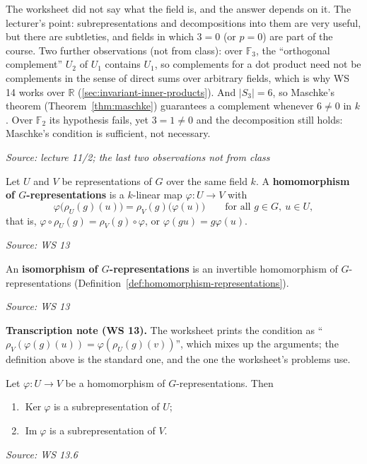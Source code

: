 \documentclass[11pt]{report}
\newcommand{\srcline}[1]{\par\hfill{\footnotesize\textit{Source: #1}}}
\begin{document}
\begin{rembox}\label{rem:why-tricky}
The worksheet did not say what the field is, and the answer depends on it. The lecturer's point: subrepresentations and decompositions into them are very useful, but there are subtleties, and fields in which $3 = 0$ (or $p = 0$) are part of the course. Two further observations (not from class): over $\mathbb{F}_3$, the ``orthogonal complement'' $U_2$ of $U_1$ contains $U_1$, so complements for a dot product need not be complements in the sense of direct sums over arbitrary fields, which is why WS 14 works over $\mathbb{R}$ (\ref{sec:invariant-inner-products}). And $|S_3| = 6$, so Maschke's theorem (Theorem~\ref{thm:maschke}) guarantees a complement whenever $6 \neq 0$ in $k$. Over $\mathbb{F}_2$ its hypothesis fails, yet $3 = 1 \neq 0$ and the decomposition still holds: Maschke's condition is sufficient, not necessary.
\srcline{lecture 11/2; the last two observations not from class}
\end{rembox}

\begin{defbox}\label{def:homomorphism-representations}
Let $U$ and $V$ be representations of $G$ over the same field $k$. A \textbf{homomorphism of $G$-representations} is a $k$-linear map $\varphi: U \to V$ with
\[ \varphi\big(\rho_U(g)(u)\big) = \rho_V(g)\big(\varphi(u)\big) \qquad \text{for all } g \in G,\ u \in U, \]
that is, $\varphi \circ \rho_U(g) = \rho_V(g) \circ \varphi$, or $\varphi(gu) = g\varphi(u)$.
\srcline{WS 13}
\end{defbox}

\begin{defbox}\label{def:isomorphism-representations}
An \textbf{isomorphism of $G$-representations} is an invertible homomorphism of $G$-representations (Definition~\ref{def:homomorphism-representations}).
\srcline{WS 13}
\end{defbox}

\textbf{Transcription note (WS 13).} The worksheet prints the condition as ``$\rho_V(\varphi(g)(u)) = \varphi(\rho_U(g)(v))$'', which mixes up the arguments; the definition above is the standard one, and the one the worksheet's problems use.

\begin{propbox}\label{prop:kernels-images-subrepresentations}
Let $\varphi: U \to V$ be a homomorphism of $G$-representations. Then
\begin{enumerate}
    \item $\operatorname{Ker}\varphi$ is a subrepresentation of $U$;
    \item $\operatorname{Im}\varphi$ is a subrepresentation of $V$.
\end{enumerate}
\srcline{WS 13.6}
\end{propbox}
\end{document}
